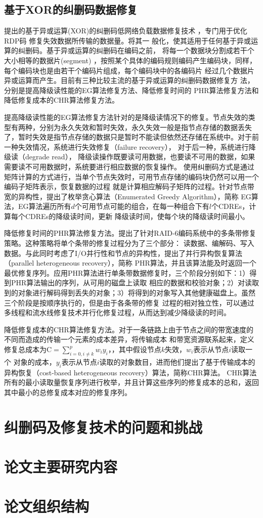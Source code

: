 \subsection{基于XOR的纠删码数据修复}

\citet{xiang2010optimal}提出的基于异或运算(XOR)的纠删码低网络负载数据修复技术
，专门用于优化RDP码\cite{corbett2004row}
修复失效数据所传输的数据量。\citet{khan2012rethinking}将其一
般化，使其适用于任何基于异或运算的纠删码。基于异或运算的纠删码在编码之前，
将每一个数据块分割成若干个大小相等的数据片(segment)
，按照某个具体的编码规则编码产生编码块，同样，每个编码块也是由若干个编码片组成，每个编码块中的各编码片
经过几个数据片异或运算而产生。目前有三种比较主流的基于异或运算的纠删码数据修复方
法，分别是提高降级读性能的EG算法修复方法、降低修复时间的 
PHR算法修复方法和降低修复成本的CHR算法修复方法。

提高降级读性能的EG算法修复方法针对的是降级读情况下的修复。节点失效的类型有两种，分别为永久失效和暂时失效，永久失效一般是指节点存储的数据丢失
了，暂时失效是指节点存储的数据只是暂时不能读但依然还存储在系统中。对于前一种失效情况，系统进行失效修复（failure recovery），
对于后一种，系统进行降级读（degrade read），
降级读操作既要读可用数据，也要读不可用的数据，如果需要读不可用数据时，系统要进行相应数据的恢复操作。
使用纠删码方式是通过矩阵计算的方式进行，当单个节点失效时，可用节点存储的编码块仍然可以用一个编码子矩阵表示，恢复数据的过程
就是计算相应解码子矩阵的过程。针对节点带宽的异构性，\citet{zhu2014boosting}提出了枚举贪心算法（Enumerated Greedy Algorithm），简称 
EG算法，EG算法遍历所有$d$个可用节点可能的组合，在每一种组合下有$l$个CDREs，计算每个CDREs的降级读时间，更新
降级读时间，使每个块的降级读时间最小。

降低修复时间的PHR算法修复方法。\citet{niu2013phr}提出了针对RAID-6编码系统中的多条带修复策略。这种策略将单个条带的修复过程分为了三个部分：
读数据、编解码、写入数据。与此同时考虑了I/O并行性和节点的异构性，提出了并行异构恢复算法（parallel heterogeneous recovery），简称
PHR算法，并且该算法能及时返回一个最优修复序列。应用PHR算法进行单条带数据修复时，三个阶段分别如下：1）得到PHR算法输出的序列，从可用的磁盘上读取
相应的数据和校验对象；2）对读取到的对象进行解码得到丢失的对象；3）将得到的对象写入其他健康磁盘上。虽然三个阶段是按顺序执行的，但是由于各条带的修复
过程的相对独立性，可以通过多线程和流水线修复技术并行化修复过程，从而达到减少降级读的时间。

降低修复成本的CHR算法修复方法。对于一条链路上由于节点之间的带宽速度的不同而造成的传输一个元素的成本差异，\citet{zhu2012cost}将传输成本
和带宽资源联系起来，定义修复总成本为$\mathrm{C}=\sum_{i=0, i \neq k}^{p} w_{i} y_{i}$，，其中假设节点$k$失效，$w_i$表示从节点$i$读取一个
对象的成本，$y_i$表示从节点$i$读取的对象数目，进而他们提出了基于传输成本的异构恢复（cost-based heterogeneous recovery）算法，简称CHR算法。
CHR算法所有的最小读取量恢复序列进行枚举，并且计算这些序列的修复成本的总和，返回其中最小的总修复成本对应的修复序列。


\section{纠删码及修复技术的问题和挑战}

\section{论文主要研究内容}

\section{论文组织结构}

